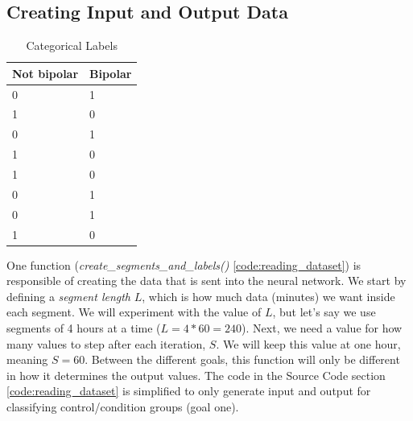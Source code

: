 \subsection{Creating Input and Output Data}
\begin{table}
  \begin{center}
    \begin{tabular}{| l | l |}
      \hline
      \textbf{Not bipolar} & \textbf{Bipolar}  \\ \hline
      0                    &  1                \\ \hline
      1                    &  0                \\ \hline
      0                    &  1                \\ \hline
      1                    &  0                \\ \hline
      1                    &  0                \\ \hline
      0                    &  1                \\ \hline
      0                    &  1                \\ \hline
      1                    &  0                \\ \hline
    \end{tabular}
    \caption{Categorical Labels}
    \label{table:categorical_labels}
  \end{center}
\end{table}

One function (\textit{create\_segments\_and\_labels()} \ref{code:reading_dataset}) is responsible of creating the data that is sent into the neural network. We start by defining a \textit{segment length} $L$, which is how much data (minutes) we want inside each segment. We will experiment with the value of $L$, but let's say we use segments of 4 hours at a time ($L=4*60=240$). Next, we need a value for how many values to step after each iteration, $S$. We will keep this value at one hour, meaning $S=60$. Between the different goals, this function will only be different in how it determines the output values. The code in the Source Code section \ref{code:reading_dataset} is simplified to only generate input and output for classifying control/condition groups (goal one).

